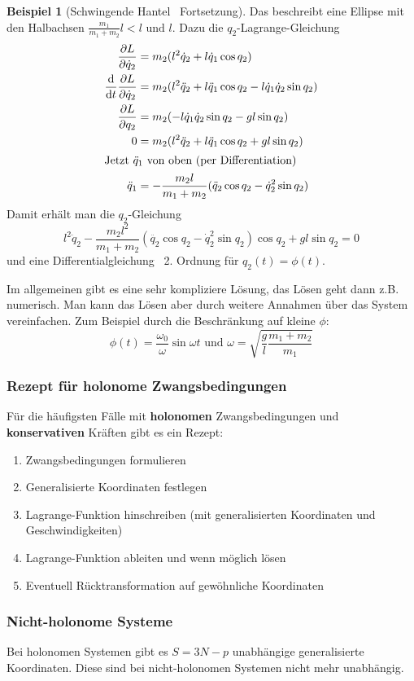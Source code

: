 \documentclass[oneside]{book}
\theoremstyle{definition}
\newtheorem*{beispiel*}{Beispiel}
\newcommand{\Dgl}{Differentialgleichung}
\renewcommand{\d}{\mathrm d}
\newcommand{\dd}[1]{\frac{\d}{\d #1}}
\newcommand{\ffpartial}[2]{\frac{\partial #1}{\partial #2}}
\begin{document}
\begin{beispiel*}[Schwingende Hantel \textendash~Fortsetzung]
	Das beschreibt eine Ellipse mit den Halbachsen $\frac{m_1}{m_1 + m_2}l < l \text{~und~} l$.
	Dazu die $q_2$-Lagrange-Gleichung
	\begin{align*}
	\ffpartial{L}{\dot{q}_2} &= m_2 (l^2 \dot{q}_2 + l \dot{q}_1 \cos q_2)\\
	\dd t \ffpartial{L}{\dot{q}_2} &= m_2 (l^2 \ddot{q}_2 + l \ddot{q}_1 \cos q_2 - l \dot{q}_1 \dot{q}_2 \sin q_2)\\
	\ffpartial{L}{q_2} &= m_2 (- l \dot{q}_1 \dot{q}_2 \sin q_2 - g l \sin q_2)\\
	0 &= m_2 (l^2 \ddot{q}_2 + l \ddot{q}_1 \cos q_2 + g l \sin q_2)\\
	\intertext{Jetzt $\ddot{q}_1$ von oben (per Differentiation)}
	\ddot{q}_1 &= - \frac{m_2 l}{m_1 + m_2} (\ddot{q}_2 \cos q_2 - \dot{q}_2^2 \sin q_2)
	\end{align*}
	Damit erhält man die $q_2$-Gleichung
	$$l^2 \ddot{q}_2 - \frac{m_2 l^2}{m_1 + m_2}(\ddot{q_2} \cos q_2 - \dot{q}_2^2 \sin q_2) \cos q_2 + g l \sin q_2 = 0$$
	und eine \Dgl~ 2. Ordnung für $q_2(t) = \phi(t)$.
	
	Im allgemeinen gibt es eine sehr kompliziere Lösung, das Lösen geht dann z.B. numerisch. Man kann das Lösen aber durch weitere Annahmen über das System vereinfachen. Zum Beispiel durch die Beschränkung auf kleine $\phi$:
	$$\phi(t) = \frac{\omega_0}{\omega} \sin \omega t \text{~und~} \omega = \sqrt{\frac{g}{l} \frac{m_1 + m_2}{m_1}}$$
\end{beispiel*}


\subsubsection{Rezept für holonome Zwangsbedingungen}

Für die häufigsten Fälle mit \textbf{holonomen} Zwangsbedingungen und \textbf{konservativen} Kräften gibt es ein Rezept:
\begin{enumerate}
\item Zwangsbedingungen formulieren
\item Generalisierte Koordinaten festlegen
\item Lagrange-Funktion hinschreiben (mit generalisierten Koordinaten und Geschwindigkeiten)
\item Lagrange-Funktion ableiten und wenn möglich lösen
\item Eventuell Rücktransformation auf gewöhnliche Koordinaten
\end{enumerate}

\subsubsection{Nicht-holonome Systeme}
Bei holonomen Systemen gibt es $S = 3N - p$ unabhängige generalisierte Koordinaten. Diese sind bei nicht-holonomen Systemen nicht mehr unabhängig.
\end{document}
